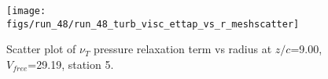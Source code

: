 \begin{figure}[H]
\centering
\texttt{[image: figs/run\_48/run\_48\_turb\_visc\_ettap\_vs\_r\_meshscatter]}
\caption{Scatter plot of $\nu_T$ pressure relaxation term vs radius at $z/c$=9.00, $V_{free}$=29.19, station 5.}
\label{fig:run_48_turb_visc_ettap_vs_r_meshscatter}
\end{figure}


